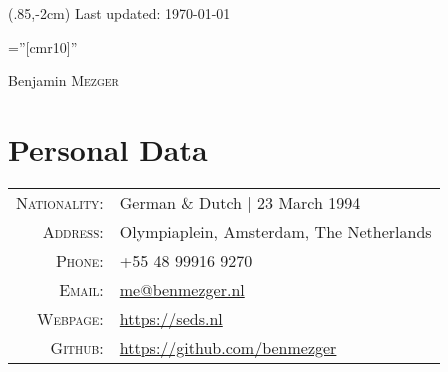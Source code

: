 \documentclass[a4paper,10pt]{article}
\begin{document}
\begin{textblock*}{100mm}(.85\textwidth,-2cm)
{\color{gray!60} Last updated: \today}
\end{textblock*}


\pagestyle{empty} %

\font\fb=''[cmr10]'' %

\par{\centering
		{\Huge Benjamin \textsc{Mezger}
	}\bigskip\par}

\section{Personal Data}

\begin{tabular}{rp{12cm}}
    \textsc{Nationality:} & German \& Dutch  | 23 March 1994 \\
    \textsc{Address:}     & Olympiaplein, Amsterdam, The Netherlands \\
    \textsc{Phone:}       & +55 48 99916 9270 \\
    \textsc{Email:}       & \href{mailto:me@benmezger.nl}{me@benmezger.nl} \\
    \textsc{Webpage:}     & \url{https://seds.nl} \\
    \textsc{Github:}      & \url{https://github.com/benmezger}
\end{tabular}

\end{document}
